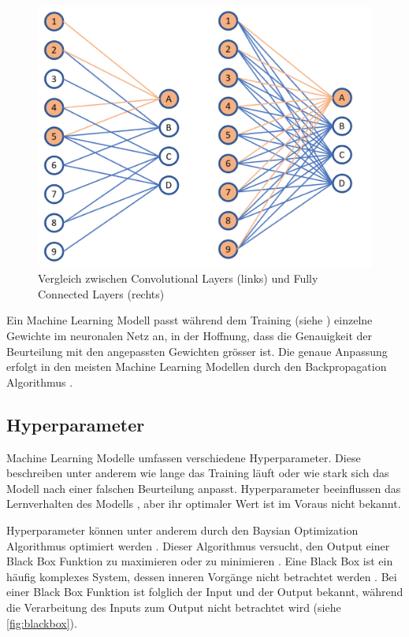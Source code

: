 \begin{figure}[!ht]
   \centering
   \includegraphics[width=\textwidth-4cm]{images/theorie/conv-v-dens.png}
   \caption{Vergleich zwischen Convolutional Layers (links) und Fully Connected Layers (rechts) \cite{unzueta_convolutional_2022}}\label{fig:conv-v-dens}
\end{figure}
 
Ein Machine Learning Modell passt während dem Training (siehe
) einzelne Gewichte im neuronalen Netz an, in der Hoffnung,
dass die Genauigkeit der Beurteilung mit den angepassten Gewichten grösser
ist. Die genaue Anpassung erfolgt in den meisten Machine Learning Modellen durch
den Backpropagation Algorithmus
\cite{ognjanovski_everything_2020}\cite{david_e_rumelhart_learning_nodate}.
 

\newpage
 
\subsection{Hyperparameter}\label{sub:t_ml_hyper}
Machine Learning Modelle umfassen verschiedene Hyperparameter. Diese beschreiben
unter anderem wie lange das Training läuft oder wie stark sich das Modell nach
einer falschen Beurteilung anpasst. Hyperparameter beeinflussen das
Lernverhalten des Modells \cite{nyuytiymbiy_parameters_2022}, aber ihr
optimaler Wert ist im Voraus nicht bekannt.
 
Hyperparameter können unter anderem durch den Baysian Optimization Algorithmus
optimiert werden \cite{agnihotri_exploring_2020}\cite{paretos_bayesian_2021}.
Dieser Algorithmus versucht, den Output einer Black Box Funktion zu maximieren
oder zu minimieren \cite[S. 15]{garnett_bayesian_nodate}. Eine Black Box ist ein
häufig komplexes System, dessen inneren Vorgänge nicht betrachtet werden
\cite{noauthor_black_2021}. Bei einer Black Box Funktion ist folglich der Input
und der Output bekannt, während die Verarbeitung des Inputs zum Output nicht
betrachtet wird (siehe \autoref{fig:blackbox}).
 
